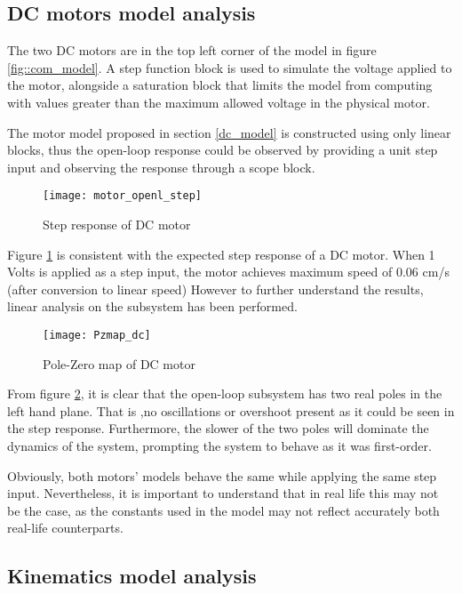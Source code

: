 \subsection{DC motors model analysis} 

The two DC motors are in the top left corner of the model in figure \ref{fig::com_model}. A step function block is used to simulate the voltage applied to the motor, alongside a saturation block that limits the model from  computing with values greater than the maximum allowed voltage in the physical motor. 

The motor model proposed in section \ref{dc_model} is constructed using only linear blocks, thus the open-loop response could be observed by providing a unit step input and observing the response through a scope block. 

\begin{figure}[h]
\centering
\texttt{[image: motor\_openl\_step]}
\caption{Step response of DC motor}
\label{fig::dc_step}
\end{figure} 

Figure \ref{fig::dc_step} is consistent with the expected step response of a DC motor. When 1 Volts is applied as a step input, the motor achieves maximum speed of 0.06 cm/s (after conversion to linear speed) However to further understand the results, linear analysis on the subsystem has been performed.

\begin{figure}[h]
\centering
\texttt{[image: Pzmap\_dc]}
\caption{Pole-Zero map of DC motor}
\label{fig::dc_pz}
\end{figure} 

From figure \ref{fig::dc_pz}, it is clear that the open-loop subsystem has two real poles in the left hand plane. That is ,no oscillations or overshoot present as it could be seen in the step response. Furthermore, the slower of the two poles will dominate the dynamics of the system, prompting the system to behave as it was first-order. 

Obviously, both motors' models behave the same while applying the same step input. Nevertheless, it is important to understand that in real life this may not be the case, as the constants used in the model may not reflect accurately both real-life counterparts.

\subsection{Kinematics model analysis} \label{kin_analysis}

